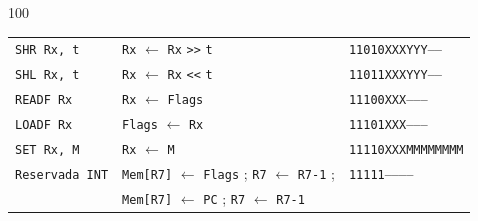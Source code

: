 \documentclass[aspectratio=169]{beamer}
\begin{document}
\begin{frame}[fragile,t]
\begin{textblock}{100}
\begin{tabular}{l|l|l}
    \texttt{SHR Rx, t}     & \texttt{Rx} $\leftarrow$ \texttt{Rx} \verb|>>| \texttt{t}          & \texttt{\textcolor{r}{11010}\textcolor{v}{XXX}\textcolor{verde}{YYY}\textcolor{gray}{-----}} \\  %
    \texttt{SHL Rx, t}     & \texttt{Rx} $\leftarrow$ \texttt{Rx} \verb|<<| \texttt{t}          & \texttt{\textcolor{r}{11011}\textcolor{v}{XXX}\textcolor{verde}{YYY}\textcolor{gray}{-----}} \\  %
    \hline
    \texttt{READF Rx}      & \texttt{Rx}    $\leftarrow$ \texttt{Flags}                         & \texttt{\textcolor{r}{11100}\textcolor{v}{XXX}\textcolor{gray}{--------}} \\  %
    \texttt{LOADF Rx}      & \texttt{Flags} $\leftarrow$ \texttt{Rx}                            & \texttt{\textcolor{r}{11101}\textcolor{v}{XXX}\textcolor{gray}{--------}} \\  %
    \hline
    \texttt{SET Rx, M}     & \texttt{Rx} $\leftarrow$ \texttt{M}                                & \texttt{\textcolor{r}{11110}\textcolor{v}{XXX}\textcolor{a}{MMMMMMMM}} \\  %
    \hline
    \texttt{Reservada INT} & \texttt{Mem[R7]} $\leftarrow$ \texttt{Flags} ; \texttt{R7} $\leftarrow$ \texttt{R7-1} ; & \texttt{\textcolor{r}{11111}\textcolor{gray}{-----------}} \\  %
                           & \texttt{Mem[R7]} $\leftarrow$ \texttt{PC} ; \texttt{R7} $\leftarrow$ \texttt{R7-1}      & \\
    \end{tabular}
    \end{textblock}
\end{frame}
\end{document}
